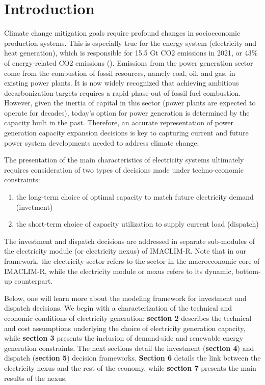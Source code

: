 \section{Introduction}
Climate change mitigation goals require profound changes in socioeconomic production systems. This is especially true for the energy system (electricity and heat generation), which is responsible for 15.5 Gt CO2 emissions in 2021, or 43\% of energy-related CO2 emissions (\cite{IEA2021}). Emissions from the power generation sector come from the combustion of fossil resources, namely coal, oil, and gas, in existing power plants. It is now widely recognized that achieving ambitious decarbonization targets requires a rapid phase-out of fossil fuel combustion. However, given the inertia of capital in this sector (power plants are expected to operate for decades), today's option for power generation is determined by the capacity built in the past. Therefore, an accurate representation of power generation capacity expansion decisions is key to capturing current and future power system developments needed to address climate change.



The presentation of the main characteristics of electricity systems ultimately requires consideration of two types of decisions made under techno-economic constraints:
\begin{enumerate}
    \item the long-term choice of optimal capacity to match future electricity demand (invetment)
    \item the short-term choice of capacity utilization to supply current load (dispatch)
\end{enumerate}
The investment and dispatch decisions are addressed in separate sub-modules of the electricity module (or electricity nexus) of IMACLIM-R. Note that in our framework, the electricity sector refers to the sector in the macroeconomic core of IMACLIM-R, while the electricity module or nexus refers to its dynamic, bottom-up counterpart.

Below, one will learn more about the modeling framework for investment and dispatch decisions. We begin with a characterization of the technical and economic conditions of electricity generation: \textbf{section 2} describes the technical and cost assumptions underlying the choice of electricity generation capacity, while \textbf{section 3} presents the inclusion of demand-side and renewable energy generation constraints. The next sections detail the investment (\textbf{section 4}) and dispatch (\textbf{section 5}) decision frameworks. \textbf{Section 6} details the link between the electricity nexus and the rest of the economy, while \textbf{section 7} presents the main results of the nexus.

